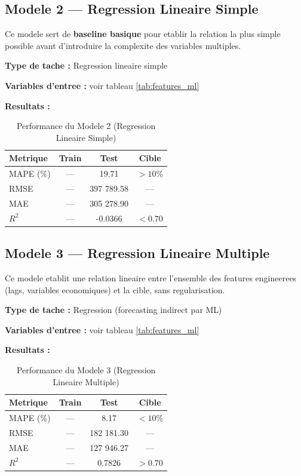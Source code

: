 \documentclass[12pt,a4paper]{report}
\begin{document}
\begin{itemize}[leftmargin=1.5em]
\subsection{Modele 2 --- Regression Lineaire Simple}

Ce modele sert de \textbf{baseline basique} pour etablir la relation la plus simple possible avant d'introduire la complexite des variables multiples.

\textbf{Type de tache :} Regression lineaire simple

\textbf{Variables d'entree :} voir tableau \ref{tab:features_ml}

\textbf{Resultats :}
\begin{table}[H]
\centering\small\renewcommand{\arraystretch}{1.3}
\begin{tabular}{lccc}
\toprule
\textbf{Metrique} & \textbf{Train} & \textbf{Test} & \textbf{Cible} \\
\midrule
MAPE (\%) & --- & 19.71 & $ >10\%$ \\
RMSE      & --- & 397 789.58 & --- \\
MAE       & --- & 305 278.90 & --- \\
$R^2$     & --- & -0.0366 & $< 0.70$ \\
\bottomrule
\end{tabular}
\caption{Performance du Modele 2 (Regression Lineaire Simple)}
\end{table}

\subsection{Modele 3 --- Regression Lineaire Multiple}

Ce modele etablit une relation lineaire entre l'ensemble des features engineerees (lags, variables economiques) et la cible, sans regularisation.

\textbf{Type de tache :} Regression (forecasting indirect par ML)

\textbf{Variables d'entree :} voir tableau \ref{tab:features_ml}

\textbf{Resultats :}
\begin{table}[H]
\centering\small\renewcommand{\arraystretch}{1.3}
\begin{tabular}{lccc}
\toprule
\textbf{Metrique} & \textbf{Train} & \textbf{Test} & \textbf{Cible} \\
\midrule
MAPE (\%) & --- & 8.17 & $< 10\%$ \\
RMSE      & --- & 182 181.30 & --- \\
MAE       & --- & 127 946.27 & --- \\
$R^2$     & --- & 0.7826 & $> 0.70$ \\
\bottomrule
\end{tabular}
\caption{Performance du Modele 3 (Regression Lineaire Multiple)}
\end{table}


\end{itemize}
\end{document}
